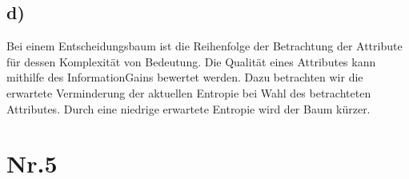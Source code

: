 \documentclass[a4paper,11pt,twoside]{article}
\begin{document}
\subsection*{d)}
Bei einem Entscheidungsbaum ist die Reihenfolge der Betrachtung der Attribute für dessen Komplexität von Bedeutung. Die Qualität eines Attributes kann mithilfe des InformationGains bewertet werden. Dazu betrachten wir die erwartete Verminderung der aktuellen Entropie bei Wahl des betrachteten Attributes. Durch eine niedrige erwartete Entropie wird der Baum kürzer.


\section*{Nr.5}
\end{document}
